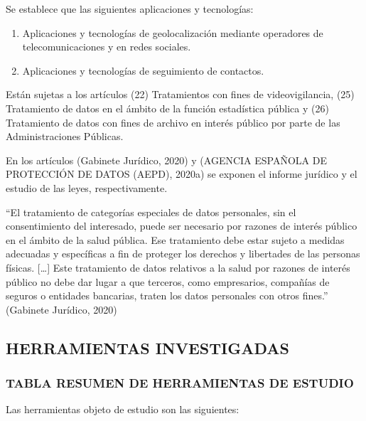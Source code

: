 \documentclass[11pt,a4paper,spanish]{article}
\begin{document}
Se establece que las siguientes aplicaciones y tecnologías:
\begin{enumerate}
\item Aplicaciones y tecnologías de geolocalización mediante operadores de telecomunicaciones y en redes sociales.
\item Aplicaciones y tecnologías de seguimiento de contactos.
\end{enumerate} 

Están sujetas a los artículos (22) Tratamientos con fines de videovigilancia, (25) Tratamiento de datos en el ámbito de la función estadística pública y (26) Tratamiento de datos con fines de archivo en interés público por parte de las Administraciones Públicas.

En los artículos (Gabinete Jurídico, 2020) y (AGENCIA ESPAÑOLA DE PROTECCIÓN DE DATOS (AEPD), 2020a) se exponen el informe jurídico y el estudio de las leyes, respectivamente.

“El tratamiento de categorías especiales de datos personales, sin el consentimiento del interesado, puede ser necesario por razones de interés público en el ámbito de la salud pública. Ese tratamiento debe estar sujeto a medidas adecuadas y específicas a fin de proteger los derechos y libertades de las personas físicas. […] Este tratamiento de datos relativos a la salud por razones de interés público no debe dar lugar a que terceros, como empresarios, compañías de seguros o entidades bancarias, traten los datos personales con otros fines.”  (Gabinete Jurídico, 2020)  

\subsection{HERRAMIENTAS INVESTIGADAS}
\subsubsection{TABLA RESUMEN DE HERRAMIENTAS DE ESTUDIO}

Las herramientas objeto de estudio son las siguientes:
\end{document}
